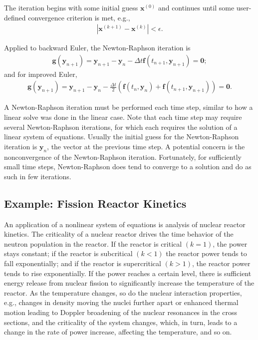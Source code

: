 The iteration begins with some initial guess $\mathbf{x}^{(0)}$ and continues until some user-defined convergence criterion is met, e.g.,
\begin{align}
  | \mathbf{x}^{(k+1)} - \mathbf{x}^{(k)} | < \epsilon.
\end{align}

Applied to backward Euler, the Newton-Raphson iteration is
\begin{align}
  \mathbf{g}(\mathbf{y}_{n+1}) = \mathbf{y}_{n+1} - \mathbf{y}_n - \Delta t \mathbf{f}( t_{n+1}, \mathbf{y}_{n+1} ) = \mathbf{0};
\end{align}
and for improved Euler,
\begin{align}
  \mathbf{g}(\mathbf{y}_{n+1}) = \mathbf{y}_{n+1} - \mathbf{y}_n - \frac{\Delta t}{2} \left( \mathbf{f}( t_n, \mathbf{y}_n ) + \mathbf{f}( t_{n+1}, \mathbf{y}_{n+1} ) \right) = \mathbf{0}.
\end{align}

A Newton-Raphson iteration must be performed each time step, similar to how a linear solve was done in the linear case. Note that each time step may require several Newton-Raphson iterations, for which each requires the solution of a linear system of equations. Usually the initial guess for the Newton-Raphson iteration is $\mathbf{y}_{n}$, the vector at the previous time step. A potential concern is the nonconvergence of the Newton-Raphson iteration. Fortunately, for sufficiently small time steps, Newton-Raphson does tend to converge to a solution and do as such in few iterations.

\subsection{Example: Fission Reactor Kinetics}

An application of a nonlinear system of equations is analysis of nuclear reactor kinetics. The criticality of a nuclear reactor drives the time behavior of the neutron population in the reactor. If the reactor is critical $(k = 1)$, the power stays constant; if the reactor is subcritical $(k < 1)$ the reactor power tends to fall exponentially; and if the reactor is supercritical $(k > 1)$, the reactor power tends to rise exponentially. If the power reaches a certain level, there is sufficient energy release from nuclear fission to significantly increase the temperature of the reactor. As the temperature changes, so do the nuclear interaction properties, e.g., changes in density moving the nuclei further apart or enhanced thermal motion leading to Doppler broadening of the nuclear resonances in the cross sections, and the criticality of the system changes, which, in turn, leads to a change in the rate of power increase, affecting the temperature, and so on.

